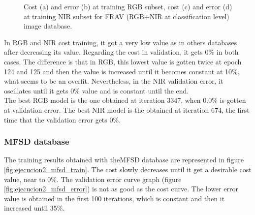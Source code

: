 \begin{figure}[htb]
\caption{Cost (a) and error (b) at training RGB subset, cost (c) and error (d) at training NIR subset for FRAV (RGB+NIR at classification level) image database.}
\label{fig:ejecucion2_frav_clas_train}
\end{figure}

In RGB and NIR cost training, it got a very low value as in others databases after decreasing its value. Regarding the cost in validation, it gets 0\% in both cases. The difference is that in RGB, this lowest value is gotten twice at epoch 124 and 125 and then the value is increased until it becomes constant at 10\%, what seems to be an overfit. Nevertheless, in the NIR validation error, it oscillates until it gets 0\% value and is constant until the end.\\

The best RGB model is the one obtained at iteration 3347, when 0.0\% is gotten at validation error. The best NIR model is the obtained at iteration 674, the first time that the validation error gets 0\%.

\subsubsection{MFSD database}
The training results obtained with theMFSD database are represented in figure \ref{fig:ejecucion2_mfsd_train}. The cost slowly decreases until it get a desirable cost value, near to 0\%. The validation error curve graph (figure \ref{fig:ejecucion2_mfsd_error}) is not as good as the cost curve. The lower error value is obtained in the first 100 iterations, which is constant and then it increased until 35\%.\\

